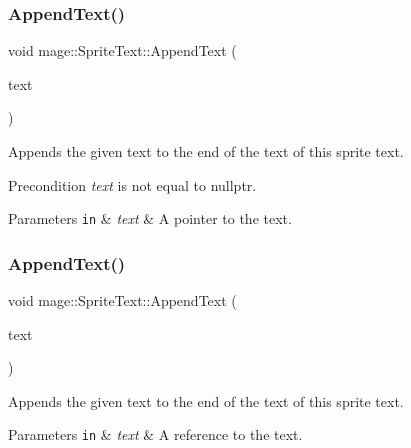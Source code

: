 \subsubsection{\texorpdfstring{Append\+Text()}{AppendText()}\hspace{0.1cm}{\footnotesize\ttfamily [2/3]}}
{\footnotesize\ttfamily void mage\+::\+Sprite\+Text\+::\+Append\+Text (\begin{DoxyParamCaption}\item[{const wchar\+\_\+t $\ast$}]{text }\end{DoxyParamCaption})}

Appends the given text to the end of the text of this sprite text.

\begin{DoxyPrecond}{Precondition}
{\itshape text} is not equal to {\ttfamily nullptr}. 
\end{DoxyPrecond}

\begin{DoxyParams}[1]{Parameters}
\mbox{\tt in}  & {\em text} & A pointer to the text. \\
\hline
\end{DoxyParams}
\hypertarget{classmage_1_1_sprite_text_a914e7f755cf8b6ddd22dd66c9108029b}{}\label{classmage_1_1_sprite_text_a914e7f755cf8b6ddd22dd66c9108029b} 
\subsubsection{\texorpdfstring{Append\+Text()}{AppendText()}\hspace{0.1cm}{\footnotesize\ttfamily [3/3]}}
{\footnotesize\ttfamily void mage\+::\+Sprite\+Text\+::\+Append\+Text (\begin{DoxyParamCaption}\item[{const \hyperlink{classmage_1_1_color_string}{Color\+String} \&}]{text }\end{DoxyParamCaption})}

Appends the given text to the end of the text of this sprite text.


\begin{DoxyParams}[1]{Parameters}
\mbox{\tt in}  & {\em text} & A reference to the text. \\
\hline
\end{DoxyParams}
\hypertarget{classmage_1_1_sprite_text_a236e243b8832cb6e32b1341e798d25bb}{}\label{classmage_1_1_sprite_text_a236e243b8832cb6e32b1341e798d25bb} 
